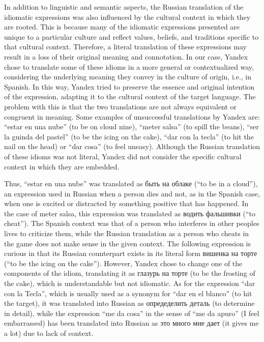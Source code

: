 In addition to linguistic and semantic aspects, the Russian translation
of the idiomatic expressions was also influenced by the cultural context
in which they are rooted. This is because many of the idiomatic
expressions presented are unique to a particular culture and reflect
values, beliefs, and traditions specific to that cultural context.
Therefore, a literal translation of these expressions may result in a
loss of their original meaning and connotation. In our case, Yandex
chose to translate some of these idioms in a more general or
contextualized way, considering the underlying meaning they convey in
the culture of origin, i.e., in Spanish. In this way, Yandex tried to
preserve the essence and original intention of the expression, adapting
it to the cultural context of the target language. The problem with this
is that the two translations are not always equivalent or congruent in
meaning. Some examples of unsuccessful translations by Yandex are:
``estar en una nube'' (to be on cloud nine), ``meter salsa'' (to spill
the beans), ``ser la guinda del pastel'' (to be the icing on the cake),
``dar con la tecla'' (to hit the nail on the head) or ``dar cosa'' (to
feel uneasy). Although the Russian translation of these idioms was not
literal, Yandex did not consider the specific cultural context in which
they are embedded.

Thus, ``estar en una nube'' was translated as \textrussian{быть на облаке} (``to be in
a cloud''), an expression used in Russian when a person dies and not, as
in the Spanish case, when one is excited or distracted by something
positive that has happened. In the case of meter salsa, this expression
was translated as \textrussian{водить фальшивки} (``to cheat''). The Spanish context
was that of a person who interferes in other people\textquotesingle s
lives to criticize them, while the Russian translation as a person who
cheats in the game does not make sense in the given context. The
following expression is curious in that its Russian counterpart exists
in its literal form \textrussian{вишенка на торте} (``to be the icing on the cake'').
However, Yandex chose to change one of the components of the idiom,
translating it as \textrussian{глазурь на торте} (to be the frosting of the cake),
which is understandable but not idiomatic. As for the expression ``dar
con la Tecla'', which is usually used as a synonym for ``dar en el
blanco'' (to hit the target), it was translated into Russian as
\textrussian{опредеделить деталь} (to determine in detail), while the expression ``me
da cosa'' in the sense of ``me da apuro'' (I feel embarrassed) has been
translated into Russian as \textrussian{это много мне дает} (it gives me a lot) due to
lack of context.

